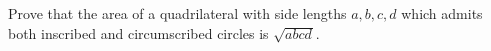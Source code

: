 Prove that the area of a quadrilateral with side lengths $a, b, c, d$
which admits both inscribed and circumscribed circles is $\sqrt{a b c d \mspace{1mu}}$.
